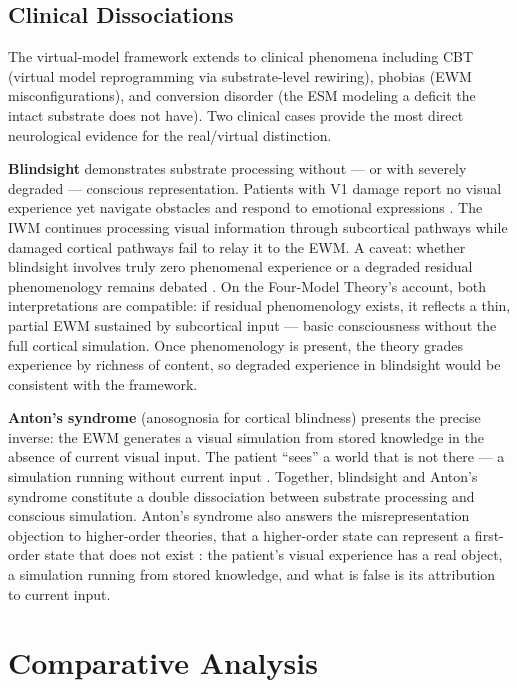 \documentclass[12pt]{article}
\begin{document}
\subsection{Clinical Dissociations}


The virtual-model framework extends to clinical phenomena including CBT (virtual model reprogramming via substrate-level rewiring), phobias (EWM misconfigurations), and conversion disorder (the ESM modeling a deficit the intact substrate does not have). Two clinical cases provide the most direct neurological evidence for the real/virtual distinction.

\textbf{Blindsight} demonstrates substrate processing without --- or with severely degraded --- conscious representation. Patients with V1 damage report no visual experience yet navigate obstacles and respond to emotional expressions \citep{Weiskrantz1986}. The IWM continues processing visual information through subcortical pathways while damaged cortical pathways fail to relay it to the EWM. A caveat: whether blindsight involves truly zero phenomenal experience or a degraded residual phenomenology remains debated \citep{Phillips2021}. On the Four-Model Theory's account, both interpretations are compatible: if residual phenomenology exists, it reflects a thin, partial EWM sustained by subcortical input --- basic consciousness without the full cortical simulation. Once phenomenology is present, the theory grades experience by richness of content, so degraded experience in blindsight would be consistent with the framework.

\textbf{Anton's syndrome} (anosognosia for cortical blindness) presents the precise inverse: the EWM generates a visual simulation from stored knowledge in the absence of current visual input. The patient ``sees'' a world that is not there --- a simulation running without current input \citep{Anton1899,Aldrich1987}. Together, blindsight and Anton's syndrome constitute a double dissociation between substrate processing and conscious simulation. Anton's syndrome also answers the misrepresentation objection to higher-order theories, that a higher-order state can represent a first-order state that does not exist \citep{Block2011}: the patient's visual experience has a real object, a simulation running from stored knowledge, and what is false is its attribution to current input.



\section{Comparative Analysis}
\end{document}
